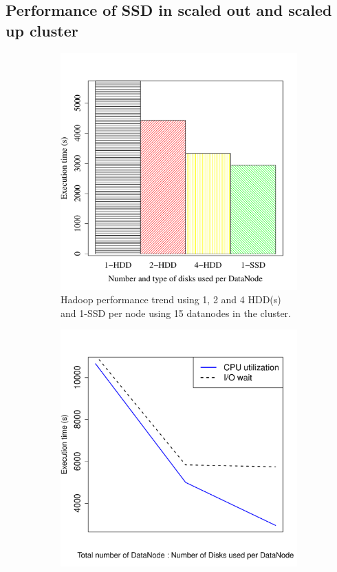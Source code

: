 \documentclass[conference]{IEEEtran}
\begin{document}
\subsection {Performance of SSD in scaled out and scaled up cluster} \label{ScaledupClusterAndSSD}
\begin{figure}[h]
  \centering
  \begin{subfigure}[b]{0.23\textwidth}
          \includegraphics[width=\textwidth]{Figure/PerormanceData/Plots/SSDHDDSameNode.pdf}
          \caption{Hadoop performance trend using 1, 2 and 4 HDD(s) and 1-SSD per node using 15 datanodes in the cluster.}
          \label{fig:SsdN4Hdd}
  \end{subfigure}
  \begin{subfigure}[b]{0.23\textwidth}
          \includegraphics[width=\textwidth]{Figure/PerormanceData/Plots/SSDHDDDiffNode.pdf}

\end{subfigure}
\end{figure}
\end{document}
